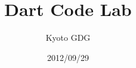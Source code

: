 \documentclass[12pt]{jarticle}
\title{Dart Code Lab}
\author{Kyoto GDG}
\date{2012/09/29}
\begin{document}
\begin{titlepage}
\maketitle
\thispagestyle{empty}
\end{titlepage}
\tableofcontents
\newpage
\end{document}
